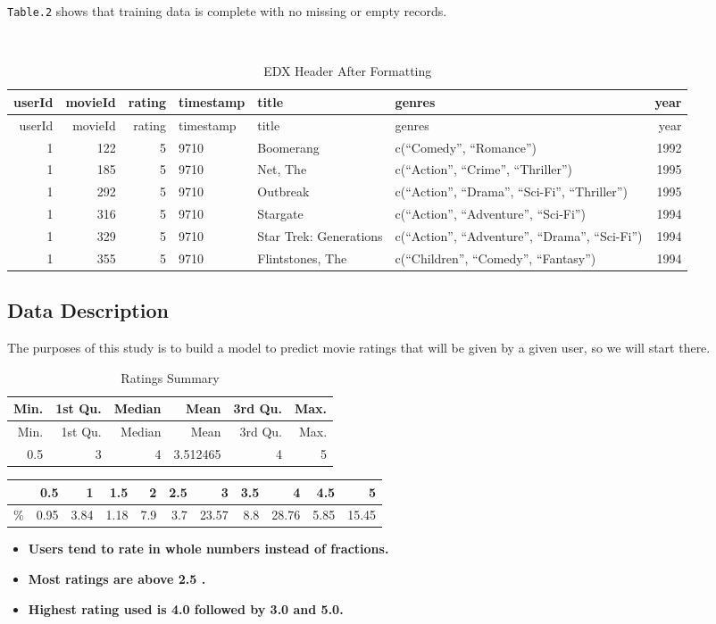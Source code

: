 \documentclass[]{article}
\providecommand{\tightlist}{%
  \setlength{\itemsep}{0pt}\setlength{\parskip}{0pt}}
\begin{document}
\texttt{Table.2} shows that training data is complete with no missing or
empty records.

\newpage

~~~

\begin{longtable}[]{@{}rrrlllr@{}}
\caption{EDX Header After Formatting}\tabularnewline
\toprule
userId & movieId & rating & timestamp & title & genres &
year\tabularnewline
\midrule
\endfirsthead
\toprule
userId & movieId & rating & timestamp & title & genres &
year\tabularnewline
\midrule
\endhead
1 & 122 & 5 & 9710 & Boomerang & c(``Comedy'', ``Romance'') &
1992\tabularnewline
1 & 185 & 5 & 9710 & Net, The & c(``Action'', ``Crime'', ``Thriller'') &
1995\tabularnewline
1 & 292 & 5 & 9710 & Outbreak & c(``Action'', ``Drama'', ``Sci-Fi'',
``Thriller'') & 1995\tabularnewline
1 & 316 & 5 & 9710 & Stargate & c(``Action'', ``Adventure'', ``Sci-Fi'')
& 1994\tabularnewline
1 & 329 & 5 & 9710 & Star Trek: Generations & c(``Action'',
``Adventure'', ``Drama'', ``Sci-Fi'') & 1994\tabularnewline
1 & 355 & 5 & 9710 & Flintstones, The & c(``Children'', ``Comedy'',
``Fantasy'') & 1994\tabularnewline
\bottomrule
\end{longtable}

\subsection{Data Description}\label{data-description}

The purposes of this study is to build a model to predict movie ratings
that will be given by a given user, so we will start there.

\begin{longtable}[]{@{}rrrrrr@{}}
\caption{Ratings Summary}\tabularnewline
\toprule
Min. & 1st Qu. & Median & Mean & 3rd Qu. & Max.\tabularnewline
\midrule
\endfirsthead
\toprule
Min. & 1st Qu. & Median & Mean & 3rd Qu. & Max.\tabularnewline
\midrule
\endhead
0.5 & 3 & 4 & 3.512465 & 4 & 5\tabularnewline
\bottomrule
\end{longtable}

\begin{longtable}[]{@{}lrrrrrrrrrr@{}}
\toprule
& 0.5 & 1 & 1.5 & 2 & 2.5 & 3 & 3.5 & 4 & 4.5 & 5\tabularnewline
\midrule
\endhead
\% & 0.95 & 3.84 & 1.18 & 7.9 & 3.7 & 23.57 & 8.8 & 28.76 & 5.85 &
15.45\tabularnewline
\bottomrule
\end{longtable}

\begin{itemize}
\tightlist
\item
  \textbf{Users tend to rate in whole numbers instead of fractions.}
\item
  \textbf{Most ratings are above 2.5 .}
\item
  \textbf{Highest rating used is 4.0 followed by 3.0 and 5.0.}
\end{itemize}
\end{document}
